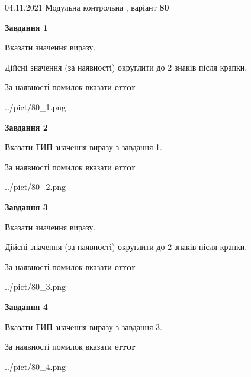 \documentclass[11pt, ukrainian]{article}
\begin{document}
{04.11.2021 Модульна контрольна , варіант  \No \textbf { 80 }\par}
{
\begin {large}
{\begin {center}\textbf{Завдання 1}\end {center}}\par
Вказати значення виразу. \par
Дійсні значення (за наявності) округлити до 2 знаків після крапки. \par
За наявності помилок вказати \textbf{error}

\begin{center}
	{../pict/80_1.png}
\end{center}
\newpage

{\begin {center}\textbf{Завдання 2}\end {center}}\par
Вказати ТИП значення виразу з завдання 1. \par
За наявності помилок вказати \textbf{error}

\begin{center}
	{../pict/80_2.png}
\end{center}
\newpage

{\begin {center}\textbf{Завдання 3}\end {center}}\par
Вказати значення виразу. \par
Дійсні значення (за наявності) округлити до 2 знаків після крапки. \par
За наявності помилок вказати \textbf{error}

\begin{center}
	{../pict/80_3.png}
\end{center}
\newpage

{\begin {center}\textbf{Завдання 4}\end {center}}\par
Вказати ТИП значення виразу з завдання 3. \par
За наявності помилок вказати \textbf{error}

\begin{center}
	{../pict/80_4.png}
\end{center}
\newpage


\end{large}}
\end{document}
